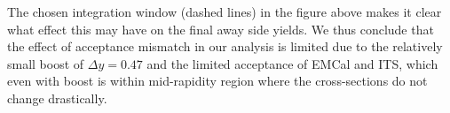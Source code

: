 The chosen integration window (dashed lines) in the figure above makes it clear what effect this may have on the final away side yields. We thus conclude that the effect of acceptance mismatch in our analysis is limited due to the relatively small boost of $\Delta y = 0.47$ and the limited acceptance of EMCal and ITS, which even with boost is within mid-rapidity region where the cross-sections do not change drastically. 





























